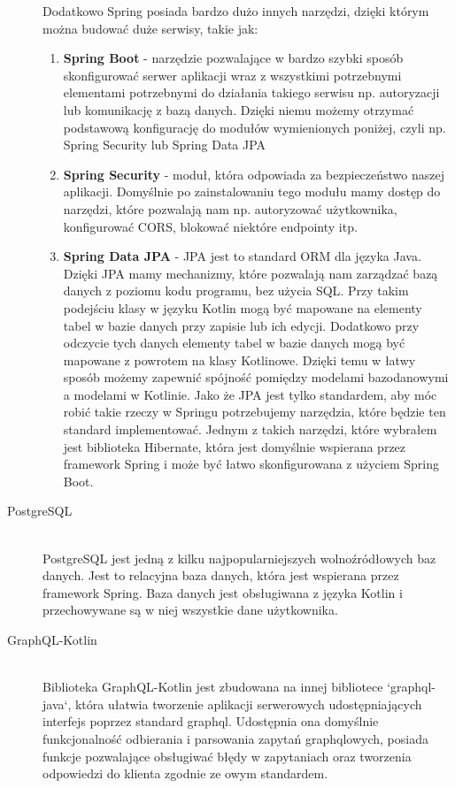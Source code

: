 \begin{description}
    Dodatkowo Spring posiada bardzo dużo innych narzędzi, dzięki którym można budować duże serwisy, takie jak:
    \begin{enumerate}
      \item \textbf{Spring Boot} - narzędzie pozwalające w bardzo szybki sposób skonfigurować serwer aplikacji wraz z wszystkimi potrzebnymi elementami potrzebnymi do działania takiego serwisu np. autoryzacji lub komunikację z bazą danych. Dzięki niemu możemy otrzymać podstawową konfigurację do modułów wymienionych poniżej, czyli np. Spring Security lub Spring Data JPA
      \item \textbf{Spring Security} - moduł, która odpowiada za bezpieczeństwo naszej aplikacji. Domyślnie po zainstalowaniu tego modułu mamy dostęp do narzędzi, które pozwalają nam np. autoryzować użytkownika, konfigurować CORS, blokować niektóre endpointy itp.
      \item \textbf{Spring Data JPA} - JPA jest to standard ORM dla języka Java. Dzięki JPA mamy mechanizmy, które pozwalają nam zarządzać bazą danych z poziomu kodu programu, bez użycia SQL. Przy takim podejściu klasy w języku Kotlin mogą być mapowane na elementy tabel w bazie danych przy zapisie lub ich edycji. Dodatkowo przy odczycie tych danych elementy tabel w bazie danych mogą być mapowane z powrotem na klasy Kotlinowe. Dzięki temu w łatwy sposób możemy zapewnić spójność pomiędzy modelami bazodanowymi a modelami w Kotlinie. Jako że JPA jest tylko standardem, aby móc robić takie rzeczy w Springu potrzebujemy narzędzia, które będzie ten standard implementować. Jednym z takich narzędzi, które wybrałem jest biblioteka Hibernate, która jest domyślnie wspierana przez framework Spring i może być łatwo skonfigurowana z użyciem Spring Boot.
    \end{enumerate}

  \item[PostgreSQL] \hfill \\ PostgreSQL jest jedną z kilku najpopularniejszych wolnoźródłowych baz danych. Jest to relacyjna baza danych, która jest wspierana przez framework Spring. Baza danych jest obsługiwana z języka Kotlin i przechowywane są w niej wszystkie dane użytkownika.
  \item[GraphQL-Kotlin] \hfill \\ Biblioteka GraphQL-Kotlin jest zbudowana na innej bibliotece `graphql-java`, która ułatwia tworzenie aplikacji serwerowych udostępniających interfejs poprzez standard graphql. Udostępnia ona domyślnie funkcjonalność odbierania i parsowania zapytań graphqlowych, posiada funkcje pozwalające obsługiwać błędy w zapytaniach oraz tworzenia odpowiedzi do klienta zgodnie ze owym standardem.
\end{description}


